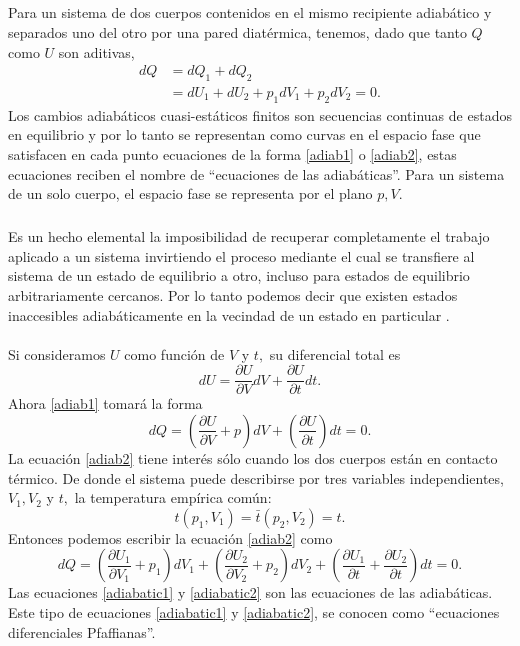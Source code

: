 \documentclass{article}
\theoremstyle{definition} \newtheorem{defi}{Definici\'on}
\theoremstyle{definition} \newtheorem{teo}{Teorema}
\theoremstyle{definition} \newtheorem{cor}{Corolario}
\begin{document}
\subparagraph{}
Para un sistema de dos cuerpos contenidos en el mismo recipiente adiab\'atico y separados uno del otro por una pared diat\'ermica, tenemos, dado que tanto $Q$ como $U$ son aditivas,
\begin{align}\label{adiab2}
dQ &= dQ_1 + dQ_2 \nonumber \\ &= dU_1 + dU_2 + p_1 dV_1 + p_2 dV_2 = 0.
\end{align}
Los cambios adiab\'aticos cuasi-est\'aticos finitos son secuencias continuas de estados en equilibrio y por lo tanto se representan como curvas en el espacio fase que satisfacen en cada punto ecuaciones de la forma \eqref{adiab1} o \eqref{adiab2}, estas ecuaciones reciben el nombre de ``ecuaciones de las adiab\'aticas''. Para un sistema de un solo cuerpo, el espacio fase se representa por el plano $p,V.$
\subparagraph{}
Es un hecho elemental la imposibilidad de recuperar completamente el trabajo aplicado a un sistema invirtiendo el proceso mediante el cual se transfiere al sistema de un estado de equilibrio a otro, incluso para estados de equilibrio arbitrariamente cercanos. Por lo tanto podemos decir  que existen estados inaccesibles adiab\'aticamente en la vecindad de un estado en particular \cite{MB}.

\paragraph{}
Si consideramos $U$ como funci\'on de $V$ y $t,$ su diferencial total es
\begin{equation}
dU = \frac{\partial{U}}{\partial{V}}dV + \frac{\partial{U}}{\partial{t}}dt.
\end{equation}
Ahora \eqref{adiab1} tomar\'a la forma
\begin{equation}\label{adiabatic1}
dQ = \left(\frac{\partial{U}}{\partial{V}} + p\right) dV + \left(\frac{\partial{U}}{\partial{t}}\right)dt = 0.
\end{equation}
La ecuaci\'on \eqref{adiab2} tiene inter\'es s\'olo cuando los dos cuerpos est\'an en contacto t\'ermico. De donde el sistema puede describirse por tres variables independientes, $V_1, V_2$ y $t,$ la temperatura emp\'irica com\'un:
\begin{equation}
t(p_1, V_1) = \bar{t}(p_2, V_2) = t.
\end{equation}
Entonces podemos escribir la ecuaci\'on \eqref{adiab2} como
\begin{equation}\label{adiabatic2}
dQ = \left(\frac{\partial{U_1}}{\partial{V_1}} + p_1\right)dV_1 + \left(\frac{\partial{U_2}}{\partial{V_2}} + p_2\right)dV_2 + \left(\frac{\partial{U_1}}{\partial{t}} + \frac{\partial{U_2}}{\partial{t}} \right)dt = 0.
\end{equation}
Las ecuaciones \eqref{adiabatic1} y \eqref{adiabatic2} son las ecuaciones de las adiab\'aticas. Este tipo de ecuaciones \eqref{adiabatic1} y \eqref{adiabatic2}, se conocen como ``ecuaciones diferenciales Pfaffianas''. 
\end{document}
